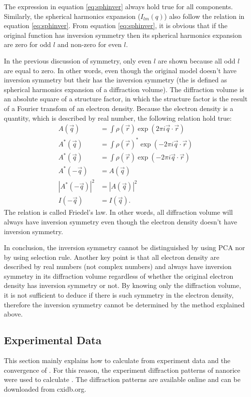 The expression in equation \ref{eq:sphinver} always hold true for all components. Similarly, the spherical harmonics expansion ($I_{lm}(q)$) also follow the relation in equation \ref{eq:sphinver}. From equation \ref{eq:sphinver}, it is obvious that if the original function has inversion symmetry then its spherical harmonics expansion are zero for odd $l$ and non-zero for even $l$. 

In the previous discussion of symmetry, only even $l$ are shown because all odd $l$ are equal to zero. In other words, even though the original model doesn’t have inversion symmetry but their \Ilm has the inversion symmetry (the \Ilm is defined as spherical harmonics expansion of a diffraction volume). The diffraction volume is an absolute square of a structure factor, in which the structure factor is the result of a Fourier transfom of an electron density. Because the electron density is a quantity, which is described by real number, the following relation hold true:
\begin{align}
A(\vec{q})&=\int \rho(\vec{r}) \exp(2 \pi i \vec{q} \cdot \vec{r}) \nonumber \\
A^{*}(\vec{q})&=\int \rho(\vec{r})^{*} \exp(-2 \pi i \vec{q} \cdot \vec{r}) \nonumber\\
A^{*}(\vec{q})&=\int \rho(\vec{r}) \exp(-2 \pi i \vec{q} \cdot \vec{r}) \nonumber\\
A^{*}(-\vec{q})&= A(\vec{q}) \nonumber\\
|A^{*}(-\vec{q})|^{2}&= |A(\vec{q})|^2 \nonumber\\
I(-\vec{q})&= I(\vec{q}). 
\label{eq:ftinv}
\end{align}
The relation is called Friedel's law. In other words, all diffraction volume will always have inversion symmetry even though the electron density doesn’t have inversion symmetry.

In conclusion, the inversion symmetry cannot be distinguished by using PCA nor by using selection rule. Another key point is that all electron density are described by real numbers (not complex numbers) and always have inversion symmetry in its diffraction volume regardless of whether the original electron density has inversion symmetry or not. By knowing only the diffraction volume, it is not sufficient to deduce if there is such symmetry in the electron density, therefore the inversion symmetry cannot be determined by the method explained above.

\subsection{Experimental Data}
This section mainly explains how to calculate \Blq from experiment data and the convergence of \Blq. For this reason, the experiment diffraction patterns of nanorice were used to calculate \Blq. The diffraction patterns are available online and can be downloaded from cxidb.org.

